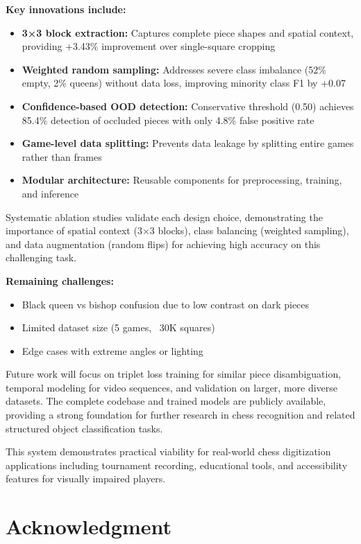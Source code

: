 \documentclass[conference]{IEEEtran}
\begin{document}
\textbf{Key innovations include:}
\begin{itemize}
    \item \textbf{3×3 block extraction:} Captures complete piece shapes and spatial context, providing +3.43\% improvement over single-square cropping
    \item \textbf{Weighted random sampling:} Addresses severe class imbalance (52\% empty, 2\% queens) without data loss, improving minority class F1 by +0.07
    \item \textbf{Confidence-based OOD detection:} Conservative threshold (0.50) achieves 85.4\% detection of occluded pieces with only 4.8\% false positive rate
    \item \textbf{Game-level data splitting:} Prevents data leakage by splitting entire games rather than frames
    \item \textbf{Modular architecture:} Reusable components for preprocessing, training, and inference
\end{itemize}

Systematic ablation studies validate each design choice, demonstrating the importance of spatial context (3×3 blocks), class balancing (weighted sampling), and data augmentation (random flips) for achieving high accuracy on this challenging task.

\textbf{Remaining challenges:}
\begin{itemize}
    \item Black queen vs bishop confusion due to low contrast on dark pieces
    \item Limited dataset size (5 games, ~30K squares)
    \item Edge cases with extreme angles or lighting
\end{itemize}

Future work will focus on triplet loss training for similar piece disambiguation, temporal modeling for video sequences, and validation on larger, more diverse datasets. The complete codebase and trained models are publicly available, providing a strong foundation for further research in chess recognition and related structured object classification tasks.

This system demonstrates practical viability for real-world chess digitization applications including tournament recording, educational tools, and accessibility features for visually impaired players.

\section*{Acknowledgment}
\end{document}
